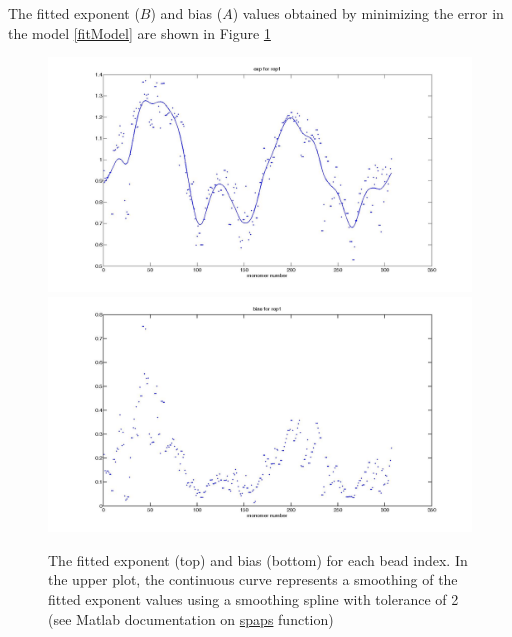 \documentclass[12pt]{paper}
\begin{document}
The fitted exponent ($B$) and bias ($A$) values obtained by minimizing the error in the model \ref{fitModel} are shown in Figure \ref{fittedExpAndBias}
\begin{figure}[H]\label{fittedExpAndBias}
\includegraphics[scale=0.15]{fittedExpValuesWithSplineRep1}
\includegraphics[scale=0.15]{fittedBiasValuesRep1}
\caption{\scriptsize{The fitted exponent (top) and bias (bottom) for each bead index. In the upper plot, the continuous curve represents a smoothing of the fitted exponent values using a smoothing spline with tolerance of 2 (see Matlab documentation on \href{http://www.mathworks.fr/fr/help/curvefit/spaps.html}{spaps} function)}}
\end{figure}
\end{document}
